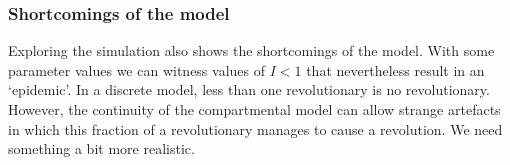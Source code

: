 \subsubsection{Shortcomings of the model}
Exploring the simulation also shows the shortcomings of the model. With some parameter values we can witness values of $I<1$ that nevertheless result in an `epidemic'. In a discrete model, less than one revolutionary is no revolutionary. However, the continuity of the compartmental model can allow strange artefacts in which this fraction of a revolutionary manages to cause a revolution. We need something a bit more realistic.
